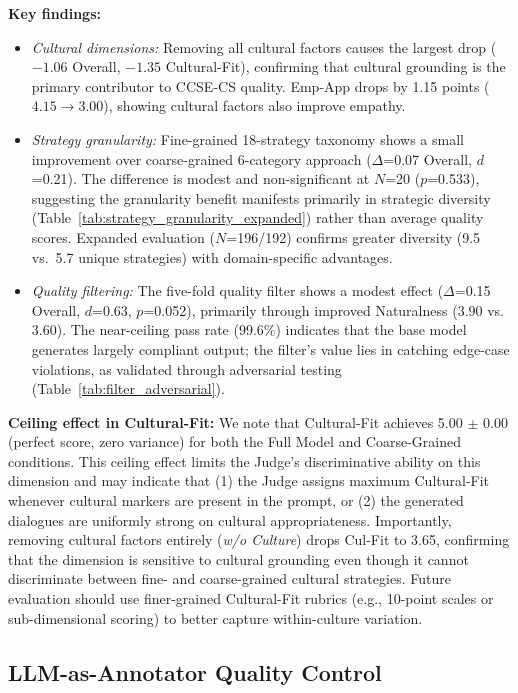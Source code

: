 \documentclass[11pt]{article}
\begin{document}
\textbf{Key findings:}
\begin{itemize}
  \item \textit{Cultural dimensions:} Removing all cultural factors causes the largest drop ($-1.06$ Overall, $-1.35$ Cultural-Fit), confirming that cultural grounding is the primary contributor to CCSE-CS quality. Emp-App drops by 1.15 points ($4.15 \to 3.00$), showing cultural factors also improve empathy.
  \item \textit{Strategy granularity:} Fine-grained 18-strategy taxonomy shows a small improvement over coarse-grained 6-category approach ($\Delta$=0.07 Overall, $d$=0.21). The difference is modest and non-significant at $N$=20 ($p$=0.533), suggesting the granularity benefit manifests primarily in strategic diversity (Table~\ref{tab:strategy_granularity_expanded}) rather than average quality scores. Expanded evaluation ($N$=196/192) confirms greater diversity (9.5 vs.\ 5.7 unique strategies) with domain-specific advantages.
  \item \textit{Quality filtering:} The five-fold quality filter shows a modest effect ($\Delta$=0.15 Overall, $d$=0.63, $p$=0.052), primarily through improved Naturalness ($3.90$ vs.\ $3.60$). The near-ceiling pass rate (99.6\%) indicates that the base model generates largely compliant output; the filter's value lies in catching edge-case violations, as validated through adversarial testing (Table~\ref{tab:filter_adversarial}).
\end{itemize}

\textbf{Ceiling effect in Cultural-Fit:} We note that Cultural-Fit achieves 5.00 $\pm$ 0.00 (perfect score, zero variance) for both the Full Model and Coarse-Grained conditions. This ceiling effect limits the Judge's discriminative ability on this dimension and may indicate that (1) the Judge assigns maximum Cultural-Fit whenever cultural markers are present in the prompt, or (2) the generated dialogues are uniformly strong on cultural appropriateness. Importantly, removing cultural factors entirely (\textit{w/o Culture}) drops Cul-Fit to 3.65, confirming that the dimension is sensitive to cultural grounding even though it cannot discriminate between fine- and coarse-grained cultural strategies. Future evaluation should use finer-grained Cultural-Fit rubrics (e.g., 10-point scales or sub-dimensional scoring) to better capture within-culture variation.

\subsection{LLM-as-Annotator Quality Control}
\end{document}
